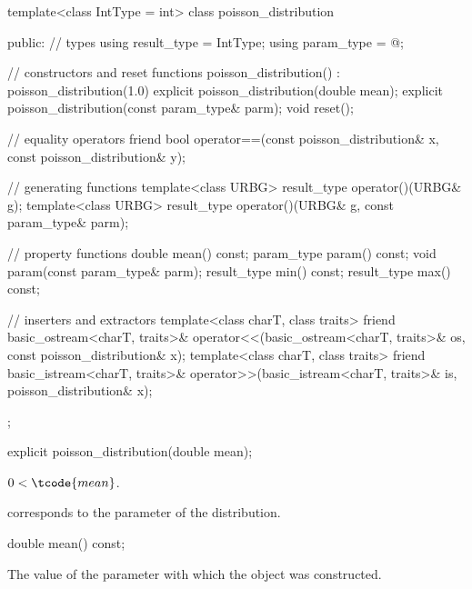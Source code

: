 %
%
\begin{codeblock}
template<class IntType = int>
  class poisson_distribution
  {
  public:
    // types
    using result_type = IntType;
    using param_type  = @\unspec@;

    // constructors and reset functions
    poisson_distribution() : poisson_distribution(1.0) {}
    explicit poisson_distribution(double mean);
    explicit poisson_distribution(const param_type& parm);
    void reset();

    // equality operators
    friend bool operator==(const poisson_distribution& x, const poisson_distribution& y);

    // generating functions
    template<class URBG>
      result_type operator()(URBG& g);
    template<class URBG>
      result_type operator()(URBG& g, const param_type& parm);

    // property functions
    double mean() const;
    param_type param() const;
    void param(const param_type& parm);
    result_type min() const;
    result_type max() const;

    // inserters and extractors
    template<class charT, class traits>
      friend basic_ostream<charT, traits>&
        operator<<(basic_ostream<charT, traits>& os, const poisson_distribution& x);
    template<class charT, class traits>
      friend basic_istream<charT, traits>&
        operator>>(basic_istream<charT, traits>& is, poisson_distribution& x);
  };
\end{codeblock}

%
\begin{itemdecl}
explicit poisson_distribution(double mean);
\end{itemdecl}

\begin{itemdescr}
\pnum
\expects
$0 < \tcode{mean}$.

\pnum
\remarks
{} corresponds to the parameter of the distribution.
\end{itemdescr}

%
\begin{itemdecl}
double mean() const;
\end{itemdecl}

\begin{itemdescr}
\pnum
\returns
The value of the  parameter
 with which the object was constructed.
\end{itemdescr}

